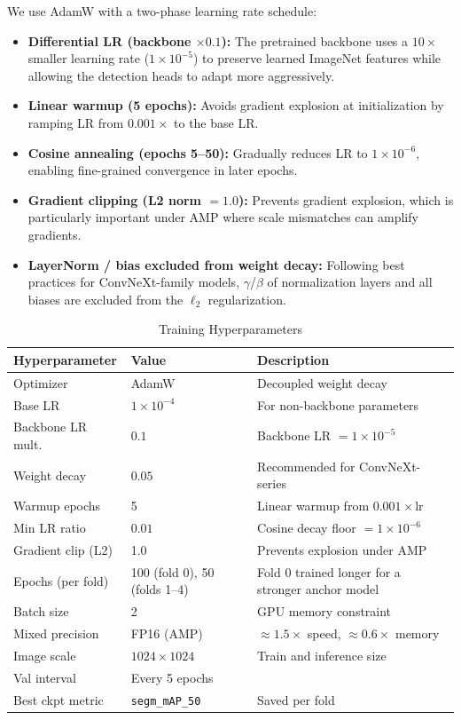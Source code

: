 \documentclass[a4paper]{article} %
\begin{document}
We use AdamW with a two-phase learning rate schedule:
\begin{itemize}
    \item \textbf{Differential LR (backbone $\times 0.1$):} The pretrained backbone uses a $10\times$ smaller learning rate ($1\times10^{-5}$) to preserve learned ImageNet features while allowing the detection heads to adapt more aggressively.
    \item \textbf{Linear warmup (5 epochs):} Avoids gradient explosion at initialization by ramping LR from $0.001\times$ to the base LR.
    \item \textbf{Cosine annealing (epochs 5--50):} Gradually reduces LR to $1\times10^{-6}$, enabling fine-grained convergence in later epochs.
    \item \textbf{Gradient clipping (L2 norm $= 1.0$):} Prevents gradient explosion, which is particularly important under AMP where scale mismatches can amplify gradients.
    \item \textbf{LayerNorm / bias excluded from weight decay:} Following best practices for ConvNeXt-family models, $\gamma$/$\beta$ of normalization layers and all biases are excluded from the $\ell_2$ regularization.
\end{itemize}

\begin{table}[H]
\centering
\caption{Training Hyperparameters}
\label{tab:training_hyperparams}
\begin{tabular}{lll}
\toprule
\textbf{Hyperparameter} & \textbf{Value} & \textbf{Description} \\
\midrule
Optimizer           & AdamW              & Decoupled weight decay \\
Base LR             & $1\times10^{-4}$   & For non-backbone parameters \\
Backbone LR mult.   & $0.1$              & Backbone LR $= 1\times10^{-5}$ \\
Weight decay        & $0.05$             & Recommended for ConvNeXt-series \\
Warmup epochs       & 5                  & Linear warmup from $0.001\times\text{lr}$ \\
Min LR ratio        & $0.01$             & Cosine decay floor $= 1\times10^{-6}$ \\
Gradient clip (L2)  & 1.0                & Prevents explosion under AMP \\
Epochs (per fold)   & 100 (fold 0), 50 (folds 1--4) & Fold 0 trained longer for a stronger anchor model \\
Batch size          & 2                  & GPU memory constraint \\
Mixed precision     & FP16 (AMP)         & $\approx1.5\times$ speed, $\approx0.6\times$ memory \\
Image scale         & $1024\times1024$   & Train and inference size \\
Val interval        & Every 5 epochs     & \\
Best ckpt metric    & \texttt{segm\_mAP\_50} & Saved per fold \\
\bottomrule
\end{tabular}
\end{table}
\end{document}
